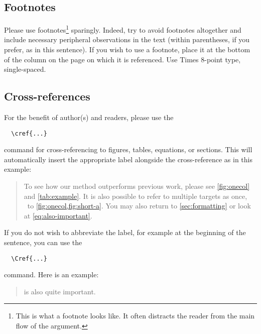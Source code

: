 \subsection{Footnotes}

Please use footnotes\footnote{This is what a footnote looks like.
It often distracts the reader from the main flow of the argument.} sparingly.
Indeed, try to avoid footnotes altogether and include necessary peripheral observations in the text (within parentheses, if you prefer, as in this sentence).
If you wish to use a footnote, place it at the bottom of the column on the page on which it is referenced.
Use Times 8-point type, single-spaced.




\subsection{Cross-references}

For the benefit of author(s) and readers, please use the
{\small\begin{verbatim}
  \cref{...}
\end{verbatim}}  command for cross-referencing to figures, tables, equations, or sections.
This will automatically insert the appropriate label alongside the cross-reference as in this example:
\begin{quotation}
  To see how our method outperforms previous work, please see \cref{fig:onecol} and \cref{tab:example}.
  It is also possible to refer to multiple targets as once, \eg~to \cref{fig:onecol,fig:short-a}.
  You may also return to \cref{sec:formatting} or look at \cref{eq:also-important}.
\end{quotation}
If you do not wish to abbreviate the label, for example at the beginning of the sentence, you can use the
{\small\begin{verbatim}
  \Cref{...}
\end{verbatim}}
command. Here is an example:
\begin{quotation}
   is also quite important.
\end{quotation}






